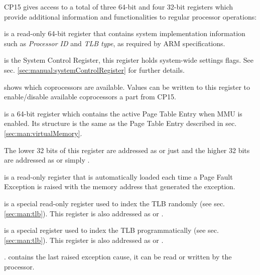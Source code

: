 
\label{sec:man:coprocessorRegisters}

CP15 gives access to a total of three 64-bit and four 32-bit registers which provide additional information and functionalities to regular processor operations:

 is a read-only 64-bit register that contains system implementation information such as \emph{Processor ID} and \emph{TLB type}, as required by ARM specifications.

 is the System Control Register, this register holds system-wide settings flags.
See sec. \ref{sec:manual:systemControlRegister} for further details.

 shows which coprocessors are available. Values can be written to this register to enable/disable available coprocessors a part from CP15.


 is a 64-bit register which contains the active Page Table Entry when MMU is enabled. Its structure is the same as the Page Table Entry described in sec. \ref{sec:man:virtualMemory}.

The lower 32 bits of this register are addressed as  or just  and the higher 32 bits are addressed as  or simply .

 is a read-only register that is automatically loaded each time a Page Fault Exception is raised with the memory address that generated the exception.

 is a special read-only register used to index the TLB randomly (see sec. \ref{sec:man:tlb}).
This register is also addressed as  or .

 is a special register used to index the TLB programmatically (see sec. \ref{sec:man:tlb}).
This register is also addressed as  or .

. contains the last raised exception cause, it can be read or written by the processor.

